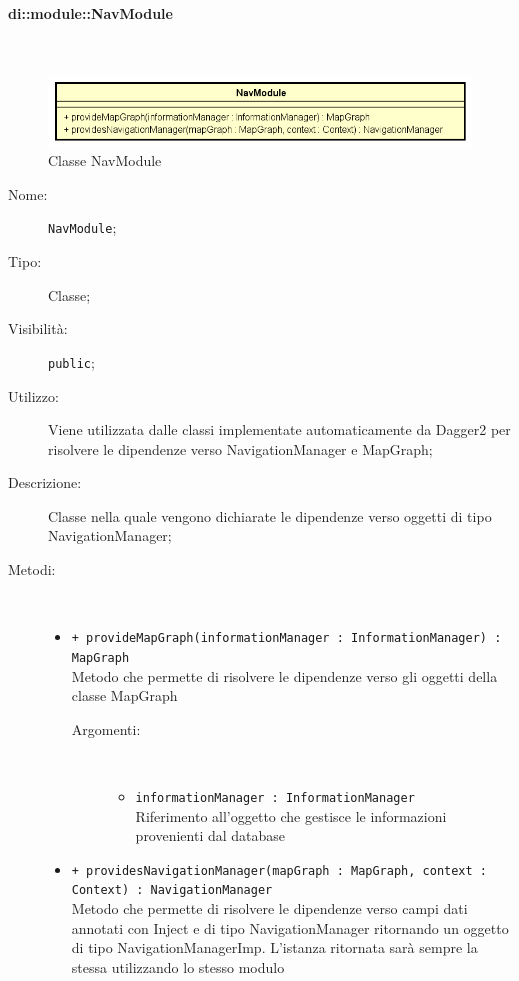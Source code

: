 \documentclass[../DefinizioneDiProdotto.tex]{subfiles}
\begin{document}
\paragraph{di::module::NavModule}
\
\begin{figure}[H]
	\centering
	\includegraphics[width=\maxwidth]{img/NavModule.png}
	\caption{Classe NavModule}\label{fig:di::module::NavModule} 
\end{figure}
\begin{description}
	\item[Nome:] \texttt{NavModule};
	\item[Tipo:] Classe;
	\item[Visibilità:] \texttt{public};
	\item[Utilizzo:] Viene utilizzata dalle classi implementate automaticamente da Dagger2 per risolvere le dipendenze verso NavigationManager e MapGraph;
	\item[Descrizione:] Classe nella quale vengono dichiarate le dipendenze verso oggetti di tipo NavigationManager;
	\item[Metodi:] \
	\begin{itemize}
		\item \texttt{+ provideMapGraph(informationManager : InformationManager) : MapGraph}\\
		Metodo che permette di risolvere le dipendenze verso gli oggetti della classe MapGraph
		\begin{description}
			\item[Argomenti:] \
			\begin{itemize}
				\item \texttt{informationManager : InformationManager}\\
				Riferimento all'oggetto che gestisce le informazioni provenienti dal database\end{itemize}
		\end{description}
		\item \texttt{+ providesNavigationManager(mapGraph : MapGraph, context : Context) : NavigationManager}\\
		Metodo che permette di risolvere le dipendenze verso campi dati annotati con Inject e di tipo NavigationManager ritornando un oggetto di tipo NavigationManagerImp. L'istanza ritornata sarà sempre la stessa utilizzando lo stesso modulo

\end{itemize}
\end{description}
\end{document}
